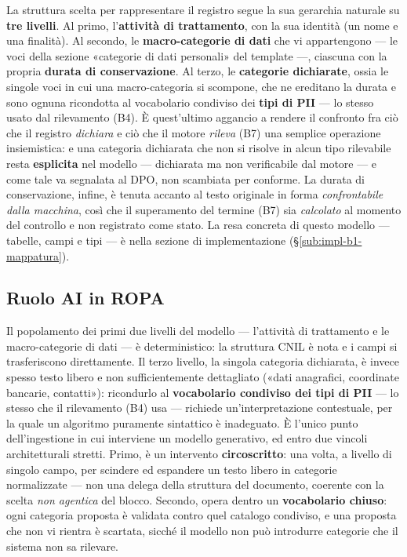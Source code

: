 La struttura scelta per rappresentare il registro segue la sua gerarchia naturale su \textbf{tre livelli}. Al primo, l'\textbf{attività di trattamento}, con la sua identità (un nome e una finalità). Al secondo, le \textbf{macro-categorie di dati} che vi appartengono --- le voci della sezione «categorie di dati personali» del template ---, ciascuna con la propria \textbf{durata di conservazione}. Al terzo, le \textbf{categorie dichiarate}, ossia le singole voci in cui una macro-categoria si scompone, che ne ereditano la durata e sono ognuna ricondotta al vocabolario condiviso dei \textbf{tipi di PII} --- lo stesso usato dal rilevamento (B4). È quest'ultimo aggancio a rendere il confronto fra ciò che il registro \emph{dichiara} e ciò che il motore \emph{rileva} (B7) una semplice operazione insiemistica: e una categoria dichiarata che non si risolve in alcun tipo rilevabile resta \textbf{esplicita} nel modello --- dichiarata ma non verificabile dal motore --- e come tale va segnalata al DPO, non scambiata per conforme. La durata di conservazione, infine, è tenuta accanto al testo originale in forma \emph{confrontabile dalla macchina}, così che il superamento del termine (B7) sia \emph{calcolato} al momento del controllo e non registrato come stato. La resa concreta di questo modello --- tabelle, campi e tipi --- è nella sezione di implementazione (§\ref{sub:impl-b1-mappatura}).


\subsection{Ruolo AI in ROPA}
\label{sub:B1-AI}

Il popolamento dei primi due livelli del modello --- l'attività di trattamento e le macro-categorie di dati --- è deterministico: la struttura CNIL è nota e i campi si trasferiscono direttamente. Il terzo livello, la singola categoria dichiarata, è invece spesso testo libero e non sufficientemente dettagliato («dati anagrafici, coordinate bancarie, contatti»): ricondurlo al \textbf{vocabolario condiviso dei tipi di PII} --- lo stesso che il rilevamento (B4) usa --- richiede un'interpretazione contestuale, per la quale un algoritmo puramente sintattico è inadeguato. È l'unico punto dell'ingestione in cui interviene un modello generativo, ed entro due vincoli architetturali stretti. Primo, è un intervento \textbf{circoscritto}: una volta, a livello di singolo campo, per scindere ed espandere un testo libero in categorie normalizzate --- non una delega della struttura del documento, coerente con la scelta \emph{non agentica} del blocco. Secondo, opera dentro un \textbf{vocabolario chiuso}: ogni categoria proposta è validata contro quel catalogo condiviso, e una proposta che non vi rientra è scartata, sicché il modello non può introdurre categorie che il sistema non sa rilevare.

